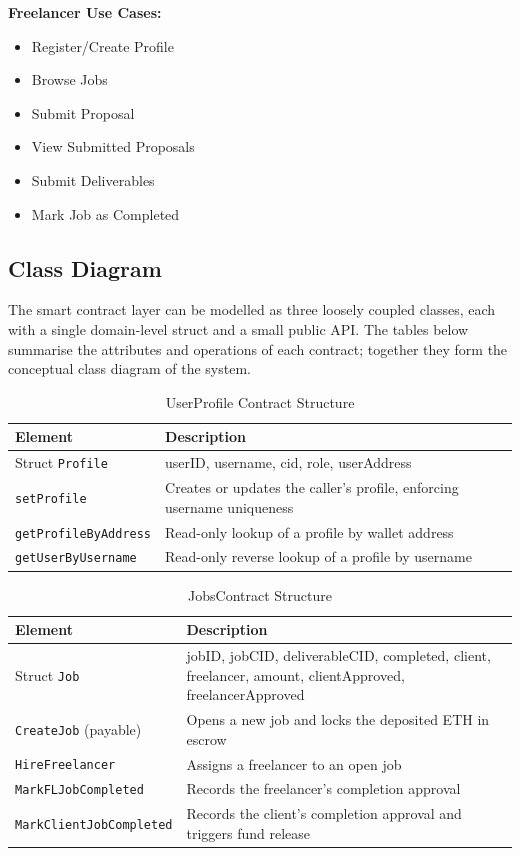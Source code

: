 \textbf{Freelancer Use Cases:}
\begin{itemize}
    \item Register/Create Profile
    \item Browse Jobs
    \item Submit Proposal
    \item View Submitted Proposals
    \item Submit Deliverables
    \item Mark Job as Completed
\end{itemize}

\subsection{Class Diagram}

The smart contract layer can be modelled as three loosely coupled classes, each with a single domain-level struct and a small public API. The tables below summarise the attributes and operations of each contract; together they form the conceptual class diagram of the system.

\begin{table}[H]
\centering
\caption{UserProfile Contract Structure}
\begin{tabular}{|p{4cm}|p{9cm}|}
\hline
\textbf{Element} & \textbf{Description} \\
\hline
Struct \texttt{Profile} & userID, username, cid, role, userAddress \\
\hline
\texttt{setProfile} & Creates or updates the caller's profile, enforcing username uniqueness \\
\hline
\texttt{getProfileByAddress} & Read-only lookup of a profile by wallet address \\
\hline
\texttt{getUserByUsername} & Read-only reverse lookup of a profile by username \\
\hline
\end{tabular}
\end{table}

\begin{table}[H]
\centering
\caption{JobsContract Structure}
\begin{tabular}{|p{4cm}|p{9cm}|}
\hline
\textbf{Element} & \textbf{Description} \\
\hline
Struct \texttt{Job} & jobID, jobCID, deliverableCID, completed, client, freelancer, amount, clientApproved, freelancerApproved \\
\hline
\texttt{CreateJob} (payable) & Opens a new job and locks the deposited ETH in escrow \\
\hline
\texttt{HireFreelancer} & Assigns a freelancer to an open job \\
\hline
\texttt{MarkFLJobCompleted} & Records the freelancer's completion approval \\
\hline
\texttt{MarkClientJobCompleted} & Records the client's completion approval and triggers fund release \\
\hline
\end{tabular}
\end{table}

